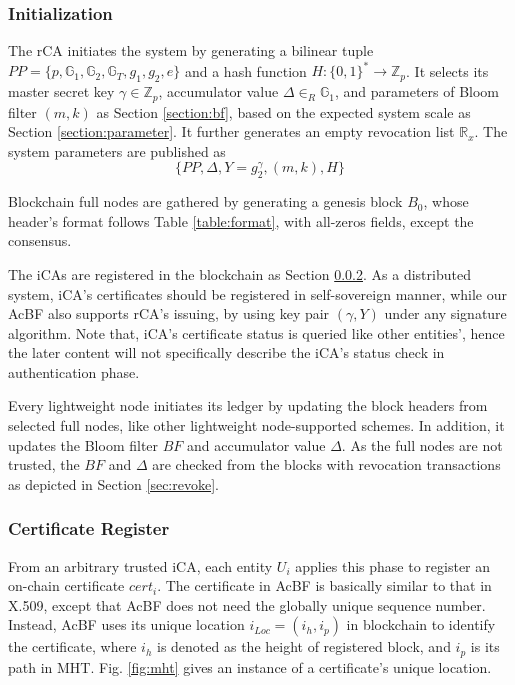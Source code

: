 \documentclass[conference]{IEEEtran}
\begin{document}
\subsubsection{Initialization}
The rCA initiates the system by generating a bilinear tuple $PP=\{p, \mathbb{G}_1, \mathbb{G}_2, \mathbb{G}_T, g_1, g_2, e\}$ and a hash function $H:\{0, 1\}^* \rightarrow \mathbb{Z}_p$. It selects its master secret key $\gamma\in \mathbb{Z}_p$, accumulator value $\Delta\in_R \mathbb{G}_1$, 
and parameters of Bloom filter $(m, k)$ as Section \ref{section:bf}, based on the expected system scale as Section \ref{section:parameter}. It further generates an empty revocation list $\mathbb{R}_x$. The system parameters are published as 
$$ \bigl\{ PP, \Delta, Y = g_2^\gamma, (m, k), H \bigr\}$$

Blockchain full nodes are gathered by generating a genesis block $B_0$, whose header's format follows Table \ref{table:format}, with all-zeros fields, except the consensus. 

The iCAs are registered in the blockchain as Section \ref{section:register}. As a distributed system, iCA's certificates should be registered in self-sovereign manner, while our AcBF also supports rCA's issuing, by using key pair $(\gamma, Y)$ under any signature algorithm. Note that, iCA's certificate status is queried like other entities', hence the later content will not specifically describe the iCA's status check in authentication phase. 


Every lightweight node initiates its ledger by updating the block headers from selected full nodes, like other lightweight node-supported schemes. In addition, it updates the Bloom filter $BF$ and accumulator value $\Delta$. As the full nodes are not trusted, the $BF$ and $\Delta$ are checked from the blocks with revocation transactions as depicted in Section \ref{sec:revoke}.

\subsubsection{Certificate Register}\label{section:register}
From an arbitrary trusted iCA, each entity $U_i$ applies this phase to register an on-chain certificate $cert_i$. The certificate in AcBF is basically similar to that in X.509, except that AcBF does not need the globally unique sequence number. Instead, AcBF uses its unique location $i_{Loc} = (i_h, i_p)$ in blockchain to identify the certificate, where $i_h$ is denoted as the height of registered block, and $i_p$ is its path in MHT. Fig. \ref{fig:mht} gives an instance of a certificate's unique location. 
\end{document}
